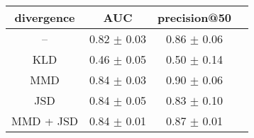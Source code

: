 \begin{tabular}[h]{c c c c} 
\toprule
divergence & AUC & precision@50 \\ 
\midrule 
-- & 0.82 $\pm$ 0.03 & 0.86 $\pm$ 0.06 \\ 
KLD  & 0.46 $\pm$ 0.05 & 0.50 $\pm$ 0.14 \\ 
MMD  & \cellcolor{gray!45} 0.84 $\pm$ 0.03 & \cellcolor{gray!45} 0.90 $\pm$ 0.06 \\ 
JSD  & \cellcolor{gray!45} 0.84 $\pm$ 0.05 &  \cellcolor{gray!30} 0.83 $\pm$ 0.10 \\ 
MMD + JSD  & \cellcolor{gray!45} 0.84 $\pm$ 0.01 & \cellcolor{gray!15} 0.87 $\pm$ 0.01 \\ 
\bottomrule
\end{tabular}
